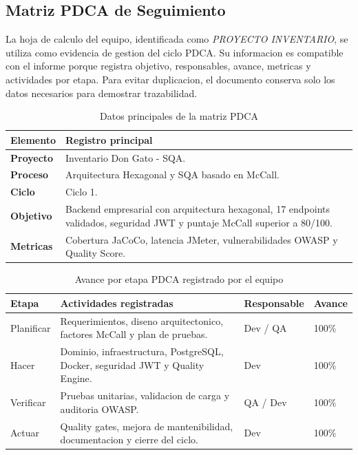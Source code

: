 \documentclass[11pt,oneside]{article}
\begin{document}
\subsection{Matriz PDCA de Seguimiento}

La hoja de calculo del equipo, identificada como \textit{PROYECTO INVENTARIO}, se utiliza como evidencia de gestion del ciclo PDCA. Su informacion es compatible con el informe porque registra objetivo, responsables, avance, metricas y actividades por etapa. Para evitar duplicacion, el documento conserva solo los datos necesarios para demostrar trazabilidad.

\begin{table}[H]
\centering
\small
\caption{Datos principales de la matriz PDCA}
\begin{tabularx}{\textwidth}{>{\bfseries}p{}Y}
\toprule
Elemento & Registro principal\\
\midrule
Proyecto & Inventario Don Gato - SQA.\\
Proceso & Arquitectura Hexagonal y SQA basado en McCall.\\
Ciclo & Ciclo 1.\\
Objetivo & Backend empresarial con arquitectura hexagonal, 17 endpoints validados, seguridad JWT y puntaje McCall superior a 80/100.\\
Metricas & Cobertura JaCoCo, latencia JMeter, vulnerabilidades OWASP y Quality Score.\\
\bottomrule
\end{tabularx}
\end{table}

\begin{table}[H]
\centering
\small
\caption{Avance por etapa PDCA registrado por el equipo}
\begin{tabularx}{\textwidth}{p{}Yp{.18\textwidth}p{.12\textwidth}}
\toprule
Etapa & Actividades registradas & Responsable & Avance\\
\midrule
Planificar & Requerimientos, diseno arquitectonico, factores McCall y plan de pruebas. & Dev / QA & 100\%\\
Hacer & Dominio, infraestructura, PostgreSQL, Docker, seguridad JWT y Quality Engine. & Dev & 100\%\\
Verificar & Pruebas unitarias, validacion de carga y auditoria OWASP. & QA / Dev & 100\%\\
Actuar & Quality gates, mejora de mantenibilidad, documentacion y cierre del ciclo. & Dev & 100\%\\
\bottomrule
\end{tabularx}
\end{table}
\end{document}
